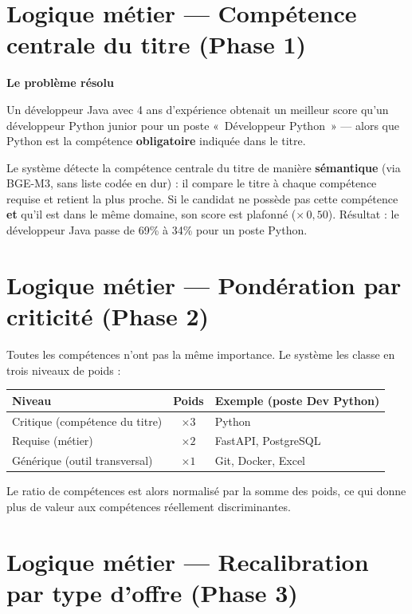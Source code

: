 \documentclass[12pt,a4paper]{report}
\newenvironment{whybox}[1][Pourquoi ce choix ?]{%
  \colorbox{yellow!20}{\textbf{\textcolor{navyblue}{#1}}}\vspace{2pt}
  \begin{framed}%
}{\end{framed}}
\begin{document}
\section{Logique métier — Compétence centrale du titre (Phase 1)}

\begin{whybox}[Le problème résolu]
Un développeur Java avec 4 ans d'expérience obtenait un meilleur score qu'un
développeur Python junior pour un poste «~Développeur Python~» — alors que Python
est la compétence \textbf{obligatoire} indiquée dans le titre.
\end{whybox}

Le système détecte la compétence centrale du titre de manière \textbf{sémantique}
(via BGE-M3, sans liste codée en dur) : il compare le titre à chaque compétence
requise et retient la plus proche. Si le candidat ne possède pas cette compétence
\textbf{et} qu'il est dans le même domaine, son score est plafonné
($\times\,0{,}50$). Résultat : le développeur Java passe de 69\% à 34\% pour un
poste Python.

\section{Logique métier — Pondération par criticité (Phase 2)}

Toutes les compétences n'ont pas la même importance. Le système les classe en
trois niveaux de poids :

\begin{center}
\begin{tabular}{lcl}
\toprule
\textbf{Niveau} & \textbf{Poids} & \textbf{Exemple (poste Dev Python)} \\
\midrule
Critique (compétence du titre) & $\times 3$ & Python \\
Requise (métier)               & $\times 2$ & FastAPI, PostgreSQL \\
Générique (outil transversal)  & $\times 1$ & Git, Docker, Excel \\
\bottomrule
\end{tabular}
\end{center}

Le ratio de compétences est alors normalisé par la somme des poids, ce qui donne
plus de valeur aux compétences réellement discriminantes.

\section{Logique métier — Recalibration par type d'offre (Phase 3)}
\end{document}

